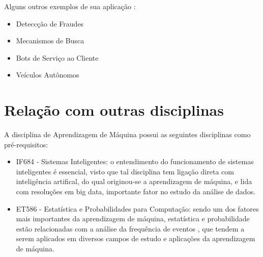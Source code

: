 \documentclass{article}
\begin{document}
\hspace{0.5in}Alguns outros exemplos de sua aplicação \cite{aplicacao}:

 \begin{itemize}
     \item Deteccção de Fraudes
     \item Mecanismos de Busca
     \item Bots de Serviço ao Cliente
     \item Veículos Autônomos
 \end{itemize}

\section{Relação com outras disciplinas}
\hspace{0.5in}A disciplina de Aprendizagem de Máquina possui as seguintes disciplinas como pré-requisitos:

\begin{itemize}
    \item IF684 - Sistemas Inteligentes: o entendimento do funcionamento de sistemas inteligentes é essencial, visto que tal disciplina tem ligação direta com inteligência artifical, do qual originou-se a aprendizagem de máquina, e lida com resoluções em big data, importante fator no estudo da análise de dados.
    
    \item ET586 - Estatística e Probabilidades para Computação: sendo um dos fatores mais importantes da aprendizagem de máquina, estatística e probabilidade estão relacionadas com a análise da frequência de eventos \cite{probs}, que tendem a serem aplicados em diversos campos de estudo e aplicações da aprendizagem de máquina.
    
\end{itemize}



\end{document}
